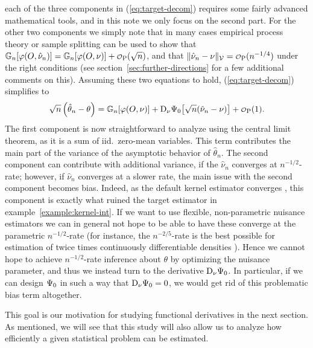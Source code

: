 \documentclass[a4,danish]{article}
\begin{document}
each of the three components in (\ref{eq:target-decom}) requires some
fairly advanced mathematical tools, and in this note we only focus on
the second part. For the other two components we simply note that in
many cases empirical process theory or sample splitting can be used to
show that
$\G{\phi(O, \hat{\nu}_n)} = \G{\phi(O, \nu)} +
\smallO_{\P}(\sqrt{n})$, and that
$\Vert \hat{\nu}_n - \nu \Vert_{\mathcal{V}} = \smallO_{\P}(n^{-1/4})$
 under the right conditions (see
section~\ref{sec:further-directions} for a few additional comments on
this). Assuming these two equations to hold, (\ref{eq:target-decom})
simplifies to
\begin{equation*}
  \sqrt{n}
  \left(
    \hat{\theta}_n - \theta
  \right)
  = \G{\phi( O, \nu)}
  + \mathrm{D_{\nu}{\TT_0}}{ \left[
      \sqrt{n}(\hat{\nu}_n - \nu)
    \right]}
  + 
  \smallO_{\P}(1).  
\end{equation*}
The first component is now straightforward to analyze using the central limit theorem, as it is a
sum of iid.\ zero-mean variables. This term contributes the main part of the variance of the
asymptotic behavior of $\hat{\theta}_n$. The second component can contribute with additional
variance, if the $\hat{\nu}_n$ converges at $n^{-1/2}$-rate; however, if $\hat{\nu}_n$ converges at
a slower rate, the main issue with the second component becomes bias. Indeed, as the default kernel
estimator converges , this component is exactly what ruined the
target estimator in example~\ref{example:kernel-int}. If we want to use flexible, non-parametric
nuisance estimators we can in general not hope to be able to have these converge at the parametric
$n^{-1/2}$-rate (for instance, the $n^{-2/5}$-rate is the best possible for estimation of twice
times continuously differentiable densities \citep[chp.~24]{van2000asymptotic}). Hence we cannot
hope to achieve $n^{-1/2}$-rate inference about $\theta$ by optimizing the nuisance parameter, and
thus we instead turn to the derivative $\mathrm{D_{\nu}{\operatorname{\Psi}_0}}$. In particular, if we can design
$\operatorname{\Psi}_0$ in such a way that $\mathrm{D_{\nu}{\operatorname{\Psi}_0}} = 0$, we would get rid of this problematic bias
term altogether.

This goal is our motivation for studying functional derivatives in the next section. As mentioned,
we will see that this study will also allow us to analyze how efficiently a given statistical
problem can be estimated.
\end{document}
